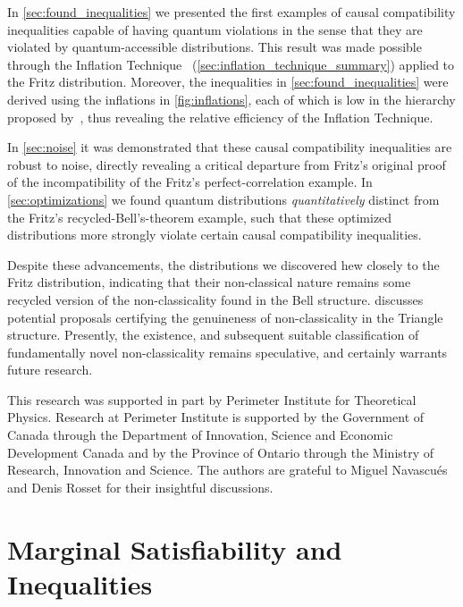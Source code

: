 \documentclass[aps, 10pt, english, twoside, pra, nofootinbib, tightenlines, longbibliography, superscriptaddress]{revtex4-1}
\begin{document}
    In \cref{sec:found_inequalities} we presented the first examples of causal compatibility inequalities capable of having quantum violations in the sense that they are violated by quantum-accessible distributions. This result was made possible through the Inflation Technique~\cite{Inflation} (\cref{sec:inflation_technique_summary}) applied to the Fritz distribution. Moreover, the inequalities in \cref{sec:found_inequalities} were derived using the inflations in \cref{fig:inflations}, each of which is low in the hierarchy proposed by~\cite{Navascues_2017}, thus revealing the relative efficiency of the Inflation Technique.

    In \cref{sec:noise} it was demonstrated that these causal compatibility inequalities are robust to noise, directly revealing a critical departure from Fritz's original proof of the incompatibility of the Fritz's perfect-correlation example. In \cref{sec:optimizations} we found quantum distributions \textit{quantitatively} distinct from the Fritz's recycled-Bell's-theorem example, such that these optimized distributions more strongly violate certain causal compatibility inequalities.

    Despite these advancements, the distributions we discovered hew closely to the Fritz distribution, indicating that their non-classical nature remains some recycled version of the non-classicality found in the Bell structure.  discusses potential proposals certifying the genuineness of non-classicality in the Triangle structure. Presently, the existence, and subsequent suitable classification of fundamentally novel non-classicality remains speculative, and certainly warrants future research.

    \begin{acknowledgments}
    This research was supported in part by Perimeter Institute for Theoretical Physics. Research at Perimeter Institute is supported by the Government of Canada through the Department of Innovation, Science and Economic Development Canada and by the Province of Ontario through the Ministry of Research, Innovation and Science. The authors are grateful to Miguel Navascués and Denis Rosset for their insightful discussions.
    \end{acknowledgments}

    \appendix

    \section{Marginal Satisfiability and Inequalities}
    \label{sec:marginal_satisfiability}
\end{document}
